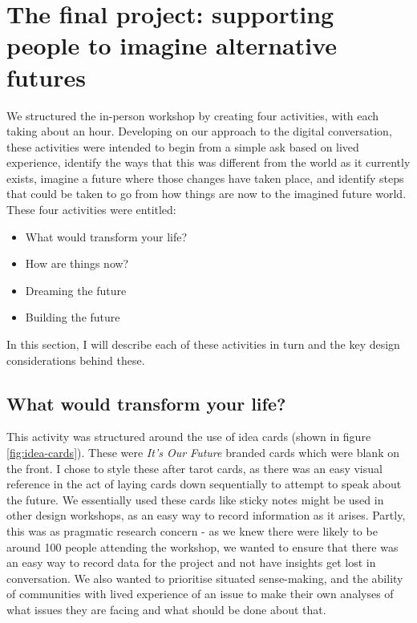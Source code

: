 \section{The final project: supporting people to imagine alternative futures }
\label{sec:7-5-final}
We structured the in-person workshop by creating four activities, with each taking about an hour. Developing on our approach to the digital conversation, these activities were intended to begin from a simple ask based on lived experience, identify the ways that this was different from the world as it currently exists, imagine a future where those changes have taken place, and identify steps that could be taken to go from how things are now to the imagined future world. These four activities were entitled:
\begin{itemize}
    \item What would transform your life?
    \item How are things now?
    \item Dreaming the future
    \item Building the future
\end{itemize}
In this section, I will describe each of these activities in turn and the key design considerations behind these. 

\subsection{What would transform your life?}
This activity was structured around the use of idea cards (shown in figure \ref{fig:idea-cards}). These were \textit{It's Our Future} branded cards which were blank on the front. I chose to style these after tarot cards, as there was an easy visual reference in the act of laying cards down sequentially to attempt to speak about the future. We essentially used these cards like sticky notes might be used in other design workshops, as an easy way to record information as it arises. Partly, this was as pragmatic research concern - as we knew there were likely to be around 100 people attending the workshop, we wanted to ensure that there was an easy way to record data for the project and not have insights get lost in conversation. We also wanted to prioritise situated sense-making, and the ability of communities with lived experience of an issue to make their own analyses of what issues they are facing and what should be done about that. 

